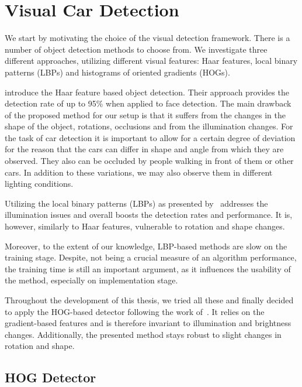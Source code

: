 
\section{Visual Car Detection} %
\label{sec:perception}

We start by motivating the choice of the visual detection framework. There is
a number of object detection methods to choose from. We investigate three
different approaches, utilizing different visual features: Haar features,
local binary patterns (LBPs) and histograms of oriented gradients (HOGs).

\citet{violajones2001} introduce the Haar feature based object detection.
Their approach provides the detection rate of up to 95\% when applied to face
detection. The main drawback of the proposed method for our setup is that it
suffers from the changes in the shape of the object, rotations, occlusions and
from the illumination changes. For the task of car detection it is important
to allow for a certain degree of deviation for the reason that the cars can
differ in shape and angle from which they are observed. They also can be
occluded by people walking in front of them or other cars. In addition to
these variations, we may also observe them in different lighting conditions.

Utilizing the local binary patterns (LBPs) as presented by~\citet{lbp2010}
addresses the illumination issues and overall boosts the detection rates and
performance. It is, however, similarly to Haar features, vulnerable to
rotation and shape changes.

Moreover, to the extent of our knowledge, LBP-based methods are slow on the
training stage. Despite, not being a crucial measure of an algorithm
performance, the training time is still an important argument, as it
influences the usability of the method, especially on implementation stage.

Throughout the development of this thesis, we tried all these and finally
decided to apply the HOG-based detector following the work
of~\citet{dalal2005}. It relies on the gradient-based features and is
therefore invariant to illumination and brightness changes. Additionally, the
presented method stays robust to slight changes in rotation and shape.

\subsection{HOG Detector}\label{sub:hog_detector}

